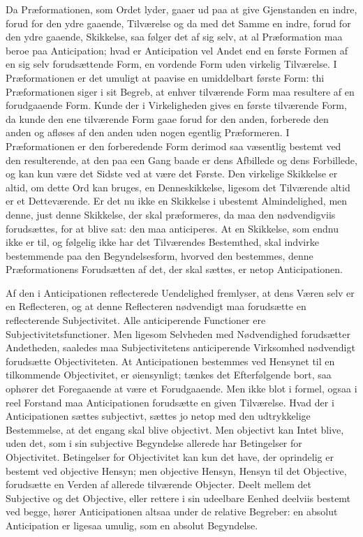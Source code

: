 \documentclass[12pt]{book}
\newcommand{\opage}[1]{\marginnote{\footnotesize\textit{[#1]}}}
\begin{document}
Da Præformationen, som Ordet lyder, gaaer ud paa at
give Gjenstanden en indre, forud for den ydre gaaende, Tilværelse
og da med det Samme en indre, forud for den ydre
gaaende, Skikkelse, saa følger det af sig selv, at al Præformation
maa beroe paa Anticipation; hvad er Anticipation vel
Andet end en første Formen af en sig selv forudsættende Form,
en vordende Form uden virkelig Tilværelse. I Præformationen
er det umuligt at paavise en umiddelbart første Form:
thi Præformationen siger i sit Begreb, at enhver tilværende
Form maa resultere af en forudgaaende Form. Kunde der i
Virkeligheden gives en første tilværende Form, da kunde den
ene tilværende Form gaae forud for den anden, forberede den
anden og afløses af den anden uden nogen egentlig Præformeren.
I Præformationen er den forberedende Form derimod
saa væsentlig bestemt ved den resulterende, at den paa een
Gang baade er dens Afbillede og dens Forbillede, og kan kun
være det Sidste ved at være det Første. Den virkelige Skikkelse
er altid, om dette Ord kan bruges, en Denneskikkelse,
ligesom det Tilværende altid er et Detteværende. Er det nu
ikke en Skikkelse i ubestemt Almindelighed, men denne, just
denne Skikkelse, der skal præformeres, da maa den nødvendigviis
forudsættes, for at blive sat: den maa anticiperes. At
en Skikkelse, som endnu ikke er til, og følgelig ikke har det
\opage{123}Tilværendes Bestemthed, skal indvirke bestemmende paa den
Begyndelsesform, hvorved den bestemmes, denne Præformationens
Forudsætten af det, der skal sættes, er netop Anticipationen.

Af den i Anticipationen reflecterede Uendelighed fremlyser,
at dens Væren selv er en Reflecteren, og at denne
Reflecteren nødvendigt maa forudsætte en reflecterende Subjectivitet.
Alle anticiperende Functioner ere Subjectivitetsfunctioner.
Men ligesom Selvheden med Nødvendighed forudsætter
Andetheden, saaledes maa Subjectivitetens anticiperende
Virksomhed nødvendigt forudsætte Objectiviteten. At
Anticipationen bestemmes ved Hensynet til en tilkommende
Objectivitet, er øiensynligt; tænkes det Efterfølgende bort, saa %
ophører det Foregaaende at være et Forudgaaende. Men
ikke blot i formel, ogsaa i reel Forstand maa Anticipationen
forudsætte en given Tilværelse. Hvad der i Anticipationen
sættes subjectivt, sættes jo netop med den udtrykkelige Bestemmelse,
at det engang skal blive objectivt. Men objectivt kan
Intet blive, uden det, som i sin subjective Begyndelse allerede
har Betingelser for Objectivitet. Betingelser for Objectivitet
kan kun det have, der oprindelig er bestemt ved objective
Hensyn; men objective Hensyn, Hensyn til det Objective, forudsætte
en Verden af allerede tilværende Objecter. Deelt
mellem det Subjective og det Objective, eller rettere i sin
udeelbare Eenhed deelviis bestemt ved begge, hører Anticipationen
altsaa under de relative Begreber: en absolut Anticipation
er ligesaa umulig, som en absolut Begyndelse.
\end{document}
